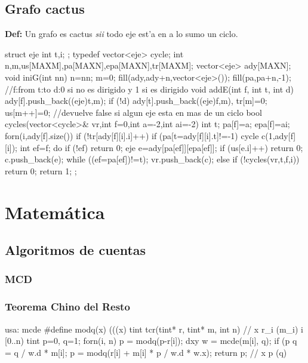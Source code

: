 \documentclass[10pt,landscape,twocolumn,a4paper,notitlepage]{article}
\begin{document}
\subsection{Grafo cactus}
\textbf{Def:} Un grafo es cactus \textit{sii} todo eje est'a en a lo sumo un ciclo.
\begin{code}
struct eje { int t,i; };
typedef vector<eje> cycle;
int n,m,us[MAXM],pa[MAXN],epa[MAXN],tr[MAXM];
vector<eje> ady[MAXN];
void iniG(int nn) { n=nn; m=0; fill(ady,ady+n,vector<eje>());
fill(pa,pa+n,-1); }
//f:from t:to d:0 si no es dirigido y 1 si es dirigido
void addE(int f, int t, int d) {
  ady[f].push_back((eje){t,m});
  if (!d) ady[t].push_back((eje){f,m}), tr[m]=0;
  us[m++]=0;
}
//devuelve false si algun eje esta en mas de un ciclo
bool cycles(vector<cycle>& vr,int f=0,int a=-2,int ai=-2) {
  int t; pa[f]=a; epa[f]=ai;
  forn(i,ady[f].size()) if (!tr[ady[f][i].i]++) if (pa[t=ady[f][i].t]!=-1) {
    cycle c(1,ady[f][i]); int ef=f;
    do {
      if (!ef) return 0;
      eje e=ady[pa[ef]][epa[ef]];
      if (us[e.i]++) return 0;
      c.push_back(e);
    } while ((ef=pa[ef])!=t);
    vr.push_back(c);
  } else if (!cycles(vr,t,f,i)) return 0;
  return 1;
};
\end{code}
\section{Matem\'atica}
\subsection{Algoritmos de cuentas}
\subsubsection{MCD}
%
\subsubsection{Teorema Chino del Resto}
\begin{code}
usa: mcde
#define modq(x) (((x)%
tint tcr(tint* r, tint* m, int n) { // x \equiv r_i (m_i) i \in [0..n)
	tint p=0, q=1;
	forn(i, n) {
		p = modq(p-r[i]);
		dxy w = mcde(m[i], q);
		if (p%
		q = q / w.d * m[i];
		p = modq(r[i] + m[i] * p / w.d * w.x);
	}
	return p; // x \equiv p (q)
}
\end{code}
%
\end{document}

